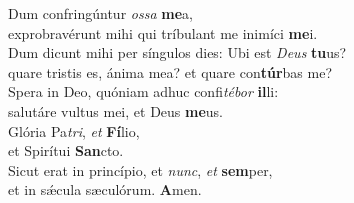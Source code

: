 \evenverse Dum confringúntur \textit{os}\textit{sa} \textbf{me}a,~\*\\
\evenverse exprobravérunt mihi qui tríbulant me inimíci \textbf{me}i.\\
\oddverse Dum dicunt mihi per síngulos dies: Ubi est \textit{De}\textit{us} \textbf{tu}us?~\*\\
\oddverse quare tristis es, ánima mea? et quare con\textbf{túr}bas me?\\
\evenverse Spera in Deo, quóniam adhuc confi\textit{té}\textit{bor} \textbf{il}li:~\*\\
\evenverse salutáre vultus mei, et Deus \textbf{me}us.\\
\oddverse Glória Pa\textit{tri}, \textit{et} \textbf{Fí}lio,~\*\\
\oddverse et Spirítui \textbf{San}cto.\\
\evenverse Sicut erat in princípio, et \textit{nunc}, \textit{et} \textbf{sem}per,~\*\\
\evenverse et in sǽcula sæculórum. \textbf{A}men.\\
